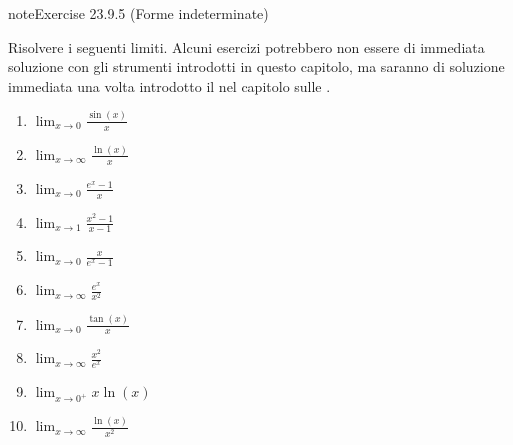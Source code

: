 \documentclass[letterpaper,10pt,italian]{jupyterBook}
\begin{document}
\begin{sphinxadmonition}{note}{Exercise 23.9.5 (Forme indeterminate)}



\sphinxAtStartPar
Risolvere i seguenti limiti. Alcuni esercizi potrebbero non essere di immediata soluzione con gli strumenti introdotti in questo capitolo, ma saranno di soluzione immediata una volta introdotto il {\hyperref[\detokenize{ch/infinitesimal_calculus/derivatives:infinitesimal-calculus-derivatives-thm-hopital}]{}} nel capitolo sulle {\hyperref[\detokenize{ch/infinitesimal_calculus/derivatives:infinitesimal-calculus-derivatives}]{}}.
\begin{enumerate}
%
\item {} 
\sphinxAtStartPar
\(\lim_{x \to 0} \frac{\sin(x)}{x}\)

\item {} 
\sphinxAtStartPar
\(\lim_{x \to \infty} \frac{\ln(x)}{x}\)

\item {} 
\sphinxAtStartPar
\(\lim_{x \to 0} \frac{e^x - 1}{x}\)

\item {} 
\sphinxAtStartPar
\(\lim_{x \to 1} \frac{x^2 - 1}{x - 1}\)

\item {} 
\sphinxAtStartPar
\(\lim_{x \to 0} \frac{x}{e^x - 1}\)

\item {} 
\sphinxAtStartPar
\(\lim_{x \to \infty} \frac{e^x}{x^2}\)

\item {} 
\sphinxAtStartPar
\(\lim_{x \to 0} \frac{\tan(x)}{x}\)

\item {} 
\sphinxAtStartPar
\(\lim_{x \to \infty} \frac{x^2}{e^x}\)

\item {} 
\sphinxAtStartPar
\(\lim_{x \to 0^+} x \ln(x)\)

\item {} 
\sphinxAtStartPar
\(\lim_{x \to \infty} \frac{\ln(x)}{x^2}\)

\end{enumerate}
\end{sphinxadmonition}
 \label{exercise:ch/infinitesimal_calculus/analysis-problems-exercise-5}
\end{document}
